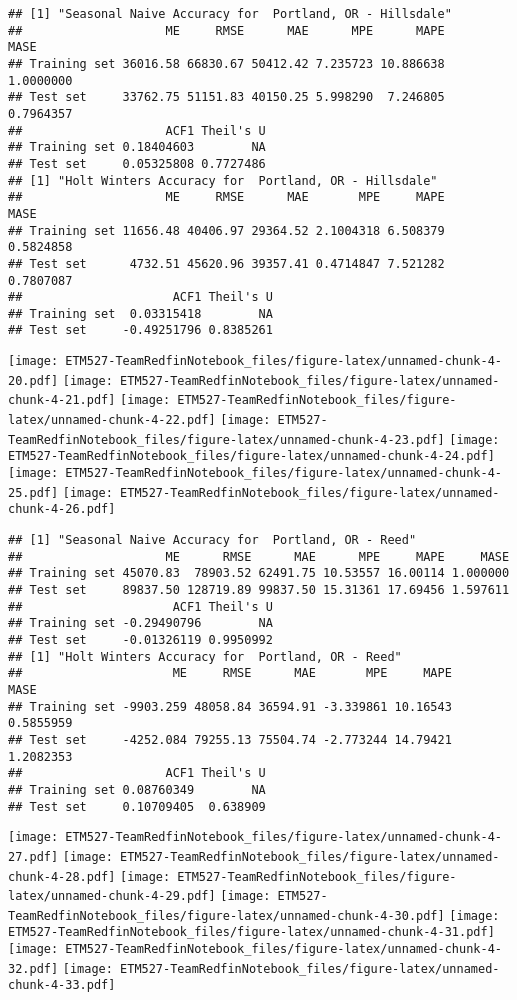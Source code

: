 \documentclass[]{article}
\begin{document}
\begin{verbatim}
## [1] "Seasonal Naive Accuracy for  Portland, OR - Hillsdale"
##                    ME     RMSE      MAE      MPE      MAPE      MASE
## Training set 36016.58 66830.67 50412.42 7.235723 10.886638 1.0000000
## Test set     33762.75 51151.83 40150.25 5.998290  7.246805 0.7964357
##                    ACF1 Theil's U
## Training set 0.18404603        NA
## Test set     0.05325808 0.7727486
## [1] "Holt Winters Accuracy for  Portland, OR - Hillsdale"
##                    ME     RMSE      MAE       MPE     MAPE      MASE
## Training set 11656.48 40406.97 29364.52 2.1004318 6.508379 0.5824858
## Test set      4732.51 45620.96 39357.41 0.4714847 7.521282 0.7807087
##                     ACF1 Theil's U
## Training set  0.03315418        NA
## Test set     -0.49251796 0.8385261
\end{verbatim}

\texttt{[image: ETM527-TeamRedfinNotebook\_files/figure-latex/unnamed-chunk-4-20.pdf]}
\texttt{[image: ETM527-TeamRedfinNotebook\_files/figure-latex/unnamed-chunk-4-21.pdf]}
\texttt{[image: ETM527-TeamRedfinNotebook\_files/figure-latex/unnamed-chunk-4-22.pdf]}
\texttt{[image: ETM527-TeamRedfinNotebook\_files/figure-latex/unnamed-chunk-4-23.pdf]}
\texttt{[image: ETM527-TeamRedfinNotebook\_files/figure-latex/unnamed-chunk-4-24.pdf]}
\texttt{[image: ETM527-TeamRedfinNotebook\_files/figure-latex/unnamed-chunk-4-25.pdf]}
\texttt{[image: ETM527-TeamRedfinNotebook\_files/figure-latex/unnamed-chunk-4-26.pdf]}

\begin{verbatim}
## [1] "Seasonal Naive Accuracy for  Portland, OR - Reed"
##                    ME      RMSE      MAE      MPE     MAPE     MASE
## Training set 45070.83  78903.52 62491.75 10.53557 16.00114 1.000000
## Test set     89837.50 128719.89 99837.50 15.31361 17.69456 1.597611
##                     ACF1 Theil's U
## Training set -0.29490796        NA
## Test set     -0.01326119 0.9950992
## [1] "Holt Winters Accuracy for  Portland, OR - Reed"
##                     ME     RMSE      MAE       MPE     MAPE      MASE
## Training set -9903.259 48058.84 36594.91 -3.339861 10.16543 0.5855959
## Test set     -4252.084 79255.13 75504.74 -2.773244 14.79421 1.2082353
##                    ACF1 Theil's U
## Training set 0.08760349        NA
## Test set     0.10709405  0.638909
\end{verbatim}

\texttt{[image: ETM527-TeamRedfinNotebook\_files/figure-latex/unnamed-chunk-4-27.pdf]}
\texttt{[image: ETM527-TeamRedfinNotebook\_files/figure-latex/unnamed-chunk-4-28.pdf]}
\texttt{[image: ETM527-TeamRedfinNotebook\_files/figure-latex/unnamed-chunk-4-29.pdf]}
\texttt{[image: ETM527-TeamRedfinNotebook\_files/figure-latex/unnamed-chunk-4-30.pdf]}
\texttt{[image: ETM527-TeamRedfinNotebook\_files/figure-latex/unnamed-chunk-4-31.pdf]}
\texttt{[image: ETM527-TeamRedfinNotebook\_files/figure-latex/unnamed-chunk-4-32.pdf]}
\texttt{[image: ETM527-TeamRedfinNotebook\_files/figure-latex/unnamed-chunk-4-33.pdf]}
\end{document}
